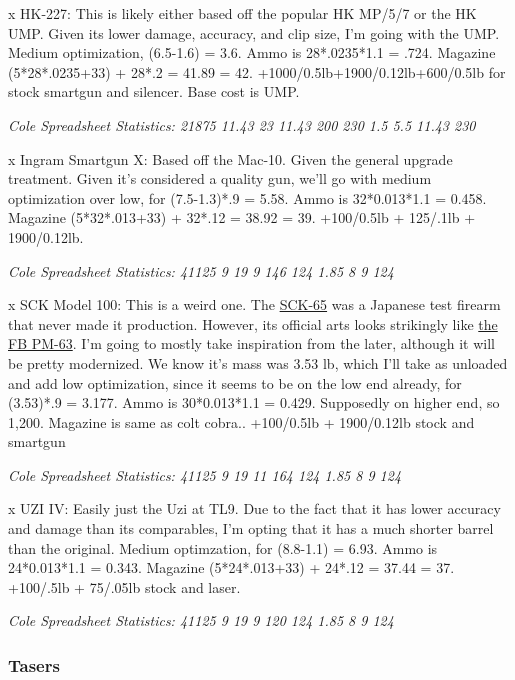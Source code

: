 \begin{multicols*}{2}
	x HK-227: This is likely either based off the popular HK MP/5/7 or the HK UMP. Given its lower damage, accuracy, and clip size, I'm going with the UMP. Medium optimization, (6.5-1.6) = 3.6. Ammo is 28*.0235*1.1 = .724. Magazine (5*28*.0235+33) + 28*.2 = 41.89 = 42. +1000/0.5lb+1900/0.12lb+600/0.5lb for stock smartgun and silencer. Base cost is UMP.
	
	\textit{\textcolor{OliveGreen}{Cole Spreadsheet Statistics: 21875 11.43 23 11.43 200 230 1.5 5.5 11.43 230}}
	
	x Ingram Smartgun X: Based off the Mac-10. Given the general upgrade treatment. Given it's considered a quality gun, we'll go with medium optimization over low, for (7.5-1.3)*.9 = 5.58. Ammo is 32*0.013*1.1 = 0.458. Magazine (5*32*.013+33) + 32*.12 = 38.92 = 39. +100/0.5lb + 125/.1lb + 1900/0.12lb.
	
	\textit{\textcolor{OliveGreen}{Cole Spreadsheet Statistics: 41125 9 19 9 146 124 1.85 8 9 124}}
	
	x SCK Model 100: This is a weird one. The \textcolor{Blue}{\href{https://en.wikipedia.org/wiki/New_Nambu_M66}{SCK-65}} was a Japanese test firearm that never made it production. However, its official arts looks strikingly like \textcolor{Blue}{\href{https://en.wikipedia.org/wiki/FB_PM-63}{the FB PM-63}}. I'm going to mostly take inspiration from the later, although it will be pretty modernized. We know it's mass was 3.53 lb, which I'll take as unloaded and add low optimization, since it seems to be on the low end already, for (3.53)*.9 = 3.177. Ammo is 30*0.013*1.1 = 0.429. Supposedly on higher end, so 1,200. Magazine is same as colt cobra.. +100/0.5lb + 1900/0.12lb stock and smartgun
	
	\textit{\textcolor{OliveGreen}{Cole Spreadsheet Statistics: 41125 9 19 11 164 124 1.85 8 9 124}}
	
	x UZI IV: Easily just the Uzi at TL9. Due to the fact that it has lower accuracy and damage than its comparables, I'm opting that it has a much shorter barrel than the original. Medium optimzation, for (8.8-1.1) = 6.93. Ammo is 24*0.013*1.1 = 0.343. Magazine (5*24*.013+33) + 24*.12 = 37.44 = 37. +100/.5lb + 75/.05lb stock and laser.
	
	\textit{\textcolor{OliveGreen}{Cole Spreadsheet Statistics: 41125 9 19 9 120 124 1.85 8 9 124}}
	
	\subsubsection{Tasers}
	

\end{multicols*}

